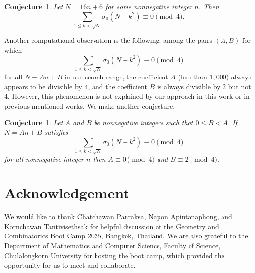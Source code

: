 \documentclass[a4paper,oneside,reqno]{amsart}
\theoremstyle{plain}
\newtheorem{conjecture}[theorem]{Conjecture}
\theoremstyle{definition}
\theoremstyle{remark}
\begin{document}
		\begin{conjecture}
			Let $N = 16n+6$ for some nonnegative integer $n$. Then 
			\[
			\sum_{1 \leq k < \sqrt{N}} \sigma_0(N - k^2) \equiv 0 \pmod 4. 
			\]
		\end{conjecture}
		
		Another computational observation is the following: among the pairs $(A,B)$ for which 
		\[
		\sum_{1 \leq k < \sqrt{N}} \sigma_0(N-k^2) \equiv 0 \pmod 4
		\]
		for all $N = An + B$ in our search range, the coefficient $A$ (less than $1,000$) always appears to be divisible by $4$, and the coefficient $B$ is always divisible by $2$ but not $4$. 
        However, this phenomenon is not explained by our approach in this work or in previous mentioned works. We make another conjecture. 
		
		\begin{conjecture}
			Let $A$ and $B$ be nonnegative integers such that $0\leq B<A$. If $N=An+B$ satisfies
			\[
			\sum_{1 \leq k < \sqrt{N}} \sigma_0(N - k^2) \equiv 0 \pmod 4 
			\]
			for all nonnegative integer $n$ then $A \equiv 0 \pmod 4$ and $B \equiv 2 \pmod 4$.
		\end{conjecture}
		
		\section*{Acknowledgement}
		
		We would like to thank Chatchawan Panraksa, Napon Apintanaphong, and Kornchawan Tantivisethsak for helpful discussion at the Geometry and Combinatorics Boot Camp 2025, Bangkok, Thailand. We are also grateful to the Department of Mathematics and Computer Science, Faculty of Science, Chulalongkorn University for hosting the boot camp, which provided the opportunity for us to meet and collaborate. 
		
		
		
		
		
	
\end{document}
